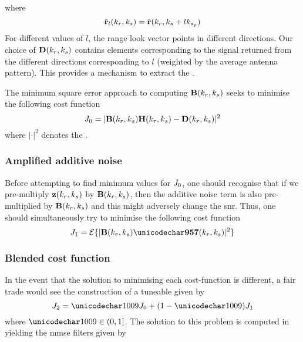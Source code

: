 where
\begin{equation}
 \hat{\mathbf{r}}_{l}(k_r,k_{s}) = \hat{\mathbf{r}}(k_r, k_{s}+lk_{s_p})
\end{equation}
For different values of $l$, the range look vector points in different directions. Our choice of $\diagAntennaMatrix(\kargs)$ contains elements corresponding to the signal returned from the different directions corresponding to $l$ (weighted by the average antenna pattern). This provides a mechanism to extract the . 
\par
The minimum square error approach to computing $\hrwsFilterMatrix(\kargs)$ seeks to minimise the following cost function
\begin{equation}
\costFunction{0} = \lvert\hrwsFilterMatrix(\kargs)\antennaMatrix(\kargs) - \diagAntennaMatrix(\kargs)\rvert^2
\end{equation}
where $\lvert\cdot\rvert^2$ denotes the . 
\subsubsection{Amplified additive noise}
Before attempting to find minimum values for $J_{0}$, one should recognise that if we pre-multiply $\mathbf{z}(k_r, k_{s})$ by $\hrwsFilterMatrix(\kargs)$, then the additive noise term is also pre-multiplied by $\hrwsFilterMatrix(\kargs)$ and this might adversely change the \gls{snr}. Thus, one should simultaneously try to minimise the following cost function
\begin{equation}
 \costFunction{1} = \expct{\lvert\hrwsFilterMatrix(\kargs)\NkNkMP(\kargs)\rvert^2}
\end{equation}
 
\subsubsection{Blended cost function}
In the event that the solution to minimising each cost-function is different, a fair trade would see the construction of a tuneable  given by
\begin{equation}
 \costFunction{2} = \cost\costFunction{0} + (1-\cost)\costFunction{1}
\end{equation}
where $\cost\in(0,1]$.
The solution to this problem is computed in \cite{NovelRadar} yielding the \gls{mmse} filters given by
\begin{center}
\end{center}


